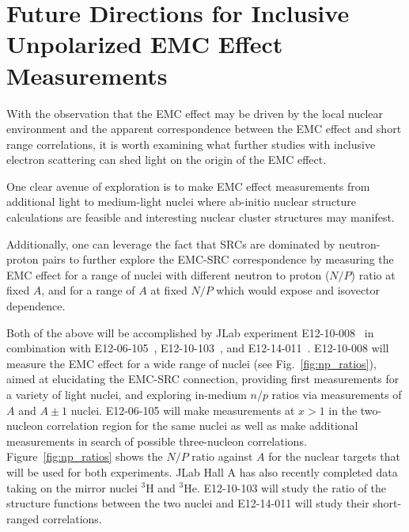 \section{Future Directions for Inclusive Unpolarized EMC Effect Measurements\label{sec:directions}}

With the observation that the EMC effect may be driven by the local nuclear environment
and the apparent correspondence between the EMC effect and short range correlations, it is worth examining what
further studies with inclusive electron scattering can shed light on the origin of the EMC effect.

One clear avenue of exploration is to make EMC effect measurements from additional light to medium-light
nuclei where ab-initio nuclear structure calculations are feasible and interesting nuclear cluster
structures may manifest.

Additionally, one can leverage the fact that SRCs are dominated by neutron-proton pairs to further explore
the EMC-SRC correspondence by measuring the EMC effect for a range of nuclei with
different neutron to proton ($N/P$) ratio at fixed $A$, and for a range of $A$ at fixed $N/P$ which would
expose and isovector dependence.

Both of the above will be accomplished by JLab experiment E12-10-008~\cite{12gev_emc} in combination
with E12-06-105~\cite{12gev_xgt1}, E12-10-103~\cite{mar}, and E12-14-011~\cite{tritsrc}. E12-10-008 will measure the EMC effect for a wide range of nuclei (see Fig.~\ref{fig:np_ratios}),
aimed at elucidating the EMC-SRC connection, providing first measurements for a variety of light nuclei,
and exploring in-medium $n/p$ ratios via measurements of $A$ and $A\pm1$ nuclei.  E12-06-105 will make
measurements at $x>1$ in the two-nucleon correlation region for the same nuclei as well as make additional
measurements in search of possible three-nucleon correlations. Figure~\ref{fig:np_ratios} shows the $N/P$
ratio against $A$ for the nuclear targets that will be used for both experiments.%
JLab Hall A has also recently completed data taking on the mirror nuclei $^3$H and $^3$He. 
E12-10-103 will study the ratio of the structure functions between the two nuclei and 
E12-14-011 will study their short-ranged correlations.

